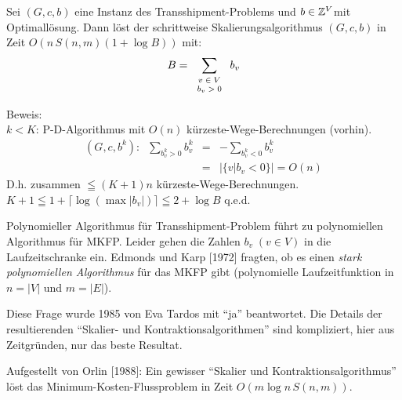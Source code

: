\begin{satz}
Sei $(G,c,b)$ eine Instanz des Transshipment-Problems und $b\in \mathbb{Z}^V$mit
Optimallösung. Dann löst der schrittweise Skalierungsalgorithmus $(G,c,b)$
in Zeit $O(n\, S(n,m)(1+\log B))$ mit:
\[B=\sum_{\mbox{\scriptsize\begin{tabular}{c}$v\in
V$\\$b_v>0$\end{tabular}}} b_v\]
\end{satz}
Beweis:\\
$k<K$: P-D-Algorithmus mit $O(n)$ kürzeste-Wege-Berechnungen (vorhin).\\
\[\begin{array}{rcl}(G,c,b^k):\; \; \displaystyle \sum_{b_{v}^k>0} b_{v}^k 
&=& - \displaystyle \sum_{b_{v}^k<0} b_{v}^k\\
&=& |\{v| b_v < 0\}| = O(n) \end{array}\]
D.h. zusammen $\leqq (K+1)n$ kürzeste-Wege-Berechnungen. $K+1 \leqq 1 +
\lceil \log (\max|b_v|)\rceil \leqq 2 + \log B$ q.e.d.

Polynomieller Algorithmus für Transshipment-Problem führt zu polynomiellen
Algorithmus für MKFP. Leider gehen die Zahlen $b_v \; (v\in V)$ in die
Laufzeitschranke ein. Edmonds und Karp [1972] fragten, ob es einen {\em
stark polynomiellen Algorithmus} für
das MKFP gibt (polynomielle Laufzeitfunktion in $n=|V|$ und $m=|E|$).

Diese Frage wurde 1985 von Eva Tardos mit "`ja"' beantwortet. Die Details
der resultierenden "`Skalier- und Kontraktionsalgorithmen"' sind
kompliziert, hier aus Zeitgründen, nur das beste Resultat.

\begin{satz}
Aufgestellt von Orlin [1988]: Ein gewisser "`Skalier und
Kontraktionsalgorithmus"' löst das Minimum-Kosten-Flussproblem in Zeit $O(m
\log n \, S(n,m))$.

\end{satz}





